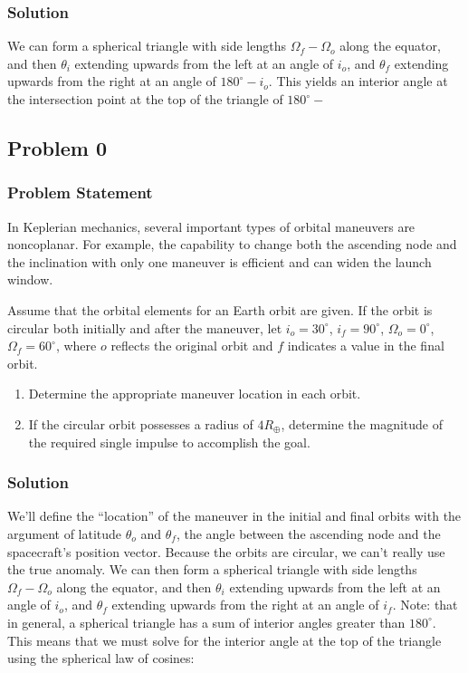 \documentclass[
]{article}
\providecommand{\tightlist}{%
  \setlength{\itemsep}{0pt}\setlength{\parskip}{0pt}}
\begin{document}
\subsubsection{Solution}\label{solution}

We can form a spherical triangle with side lengths
\(\Omega_f - \Omega_o\) along the equator, and then \(\theta_i\)
extending upwards from the left at an angle of \(i_o\), and \(\theta_f\)
extending upwards from the right at an angle of \(180^\circ-i_o\). This
yields an interior angle at the intersection point at the top of the
triangle of \(180^\circ-\)

\subsection{Problem 0}\label{problem-0}

\subsubsection{Problem Statement}\label{problem-statement-1}

In Keplerian mechanics, several important types of orbital maneuvers are
noncoplanar. For example, the capability to change both the ascending
node and the inclination with only one maneuver is efficient and can
widen the launch window.

Assume that the orbital elements for an Earth orbit are given. If the
orbit is circular both initially and after the maneuver, let
\(i_o=30^\circ\), \(i_f=90^\circ\), \(\Omega_o=0^\circ\),
\(\Omega_f=60^\circ\), where \(o\) reflects the original orbit and \(f\)
indicates a value in the final orbit.

\begin{enumerate}
\tightlist
\item
  Determine the appropriate maneuver location in each orbit.
\item
  If the circular orbit possesses a radius of \(4R_\oplus\), determine
  the magnitude of the required single impulse to accomplish the goal.
\end{enumerate}

\subsubsection{Solution}\label{solution-1}

We'll define the ``location'' of the maneuver in the initial and final
orbits with the argument of latitude \(\theta_o\) and \(\theta_f\), the
angle between the ascending node and the spacecraft's position vector.
Because the orbits are circular, we can't really use the true anomaly.
We can then form a spherical triangle with side lengths
\(\Omega_f - \Omega_o\) along the equator, and then \(\theta_i\)
extending upwards from the left at an angle of \(i_o\), and \(\theta_f\)
extending upwards from the right at an angle of \(i_f\). Note: that in
general, a spherical triangle has a sum of interior angles greater than
\(180^\circ\). This means that we must solve for the interior angle at
the top of the triangle using the spherical law of cosines:
\end{document}
